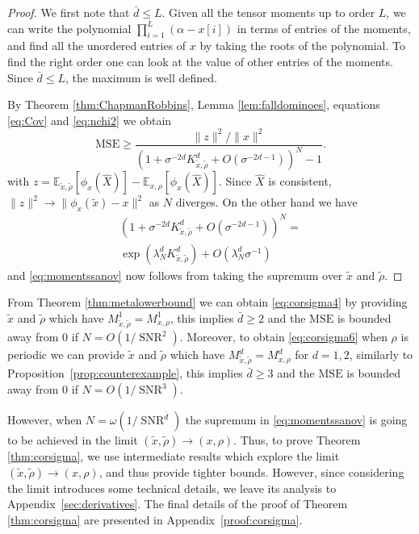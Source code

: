 \documentclass{IEEEtran}
\numberwithin{equation}{section}
\numberwithin{figure}{section}
\theoremstyle{plain}
\theoremstyle{definition}
\theoremstyle{remark}
\theoremstyle{plain}
\theoremstyle{remark}
\theoremstyle{plain}
\theoremstyle{plain}
\theoremstyle{remark}
\newcommand{\E}{\mathbb{E}}
\newcommand{\SNR}{\operatorname{SNR}}
\newcommand{\MSE}{\mathrm{MSE}}
\newcommand{\OO}{{O}}
\begin{document}
\begin{proof}
	We first note that $\bar d\le L$. Given all the tensor moments up to order $L$, we can write the polynomial $\prod_{i=1}^L (\alpha-x[i])$ in terms of entries of the moments, and find all the unordered entries of $x$ by taking the roots of the polynomial. To find the right order one can look at the value of other entries of the moments. Since $\bar d\le L$, the maximum is well defined.
	
	 By Theorem \ref{thm:ChapmanRobbins}, Lemma \ref{lem:falldominoes}, equations \eqref{eq:Cov} and \eqref{eq:nchi2} we obtain
	\begin{equation}\label{eq:limitexplanation}
	\MSE\ge \frac{\|z\|^2/\|x\|^2}{\left(1+\sigma^{-2d} K^{d}_{\tilde x,\tilde \rho}+\OO\left(\sigma^{-2d-1}\right)\right)^N-1}.
	\end{equation}
	with $z=\E_{\tilde x,\tilde \rho}[\phi_{x}(\widehat X)]-\E_{x,\rho}[\phi_{x}(\widehat X)]$. Since $\hat X$ is consistent, $\|z\|^2\rightarrow \|\phi_{x}(\tilde x)-x\|^2$ as $N$ diverges. On the other hand we have
	\begin{multline*}
	\left(1+\sigma^{-2d} K^{d}_{\tilde x,\tilde \rho}+\OO(\sigma^{-2d-1})\right)^N=\\\exp\left(\lambda^{d}_N K^{d}_{\tilde x,\tilde \rho}\right)+\OO\left(\lambda^{d}_N \sigma^{-1}\right)
	\end{multline*}
	and \eqref{eq:momentssanov} now follows from taking the supremum over $\tilde x$ and $\tilde \rho$.
\end{proof}
From Theorem \ref{thm:metalowerbound} we can obtain \eqref{eq:corsigma4} by providing $\tilde x$ and $\tilde \rho$ which have $M^1_{\tilde x,\tilde \rho}=M^1_{x,\rho}$, this implies $\bar d\ge 2$ and the $\MSE$ is bounded away from 0 if $N=\OO(1/\SNR^2)$. Moreover, to obtain \eqref{eq:corsigma6} when $\rho$ is periodic we can provide $\tilde x$ and $\tilde \rho$ which have $M^d_{\tilde x,\tilde \rho}=M^d_{x,\rho}$ for $d=1,2$, similarly to Proposition~\ref{prop:counterexample}, this implies $\bar d\ge 3$ and the $\MSE$ is bounded away from 0 if $N=\OO(1/\SNR^3)$.

However, when $N=\omega(1/\SNR^{\bar d})$ the supremum in \eqref{eq:momentssanov} is going to be achieved in the limit $(\tilde x, \tilde \rho)\rightarrow (x,\rho)$. Thus, to prove Theorem \ref{thm:corsigma}, we use intermediate results which explore the limit $(\tilde x, \tilde \rho)\rightarrow (x,\rho)$, and thus provide tighter bounds. However, since considering the limit introduces some technical details, we leave its analysis to Appendix~\ref{sec:derivatives}. The final details of the proof of Theorem \ref{thm:corsigma} are presented in Appendix~\ref{proof:corsigma}.
\end{document}
